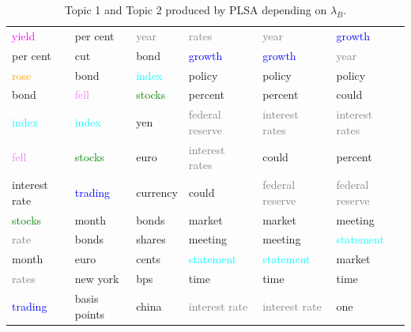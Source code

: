 \documentclass[11pt,a4paper,english,oneside]{book}
\numberwithin{equation}{chapter}
\begin{document}
\begin{table}
\begin{tabular}{ p{3cm}  p{3cm}  p{3cm} | p{3cm}  p{3cm}  p{3cm}}
		  \textcolor{magenta}{yield}			&per cent						&\textcolor{gray}{year} 		& 	\textcolor{gray}{rates}				&\textcolor{gray}{year}			& \textcolor{blue}{growth} \\
		  per cent		  						&cut 							&bond 							& 	\textcolor{blue}{growth }			&\textcolor{blue}{growth}		& \textcolor{gray}{year}\\
		  \textcolor{orange}{rose }				&bond 							&\textcolor{cyan}{index }		& 	policy 								&policy			 				& policy \\
		  bond 			  						&\textcolor{violet}{fell }		&\textcolor{green}{stocks}		& 	percent 							&percent 						& could \\
		  \textcolor{cyan}{index }				&\textcolor{cyan}{index }		&yen 							& 	\textcolor{gray}{federal reserve}	&\textcolor{gray}{interest rates}& \textcolor{gray}{interest rates}\\
		  \textcolor{violet}{fell } 		 	&\textcolor{green}{stocks}		&euro 							& 	\textcolor{gray}{interest rates}	&could 							& percent \\
		  interest rate  						&\textcolor{blue}{trading}		&currency 						& 	could 								&\textcolor{gray}{federal reserve}& \textcolor{gray}{federal reserve}\\
		  \textcolor{green}{stocks}				&month 							&bonds 							& 	market 								&market 						& meeting \\
		  \textcolor{gray}{rate  }				&bonds 							&shares 						& 	meeting 							&meeting 						& \textcolor{cyan}{statement} \\
		  month 		  						&euro 							&cents 							& \textcolor{cyan}{statement}			&\textcolor{cyan}{statement}	& market \\
		  \textcolor{gray}{rates}				&new york						&bps 							& 	time 								&time 							& time \\
		  \textcolor{blue}{trading}				&basis points					&china 							& 	\textcolor{gray}{interest rate}		&\textcolor{gray}{interest rate}&one  \\		  
		\bottomrule %
	\end{tabular}
	\caption{Topic 1 and Topic 2 produced by PLSA depending on $\lambda_B$.} %
	\label{tab:topics2} %
\end{table}
\end{document}
